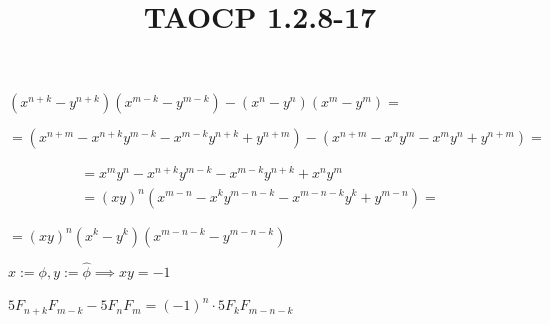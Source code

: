 \documentclass{article}
\title{TAOCP 1.2.8\mbox{-}17}
\begin{document}
\maketitle

\( (x^{n+k} - y^{n+k})(x^{m-k} - y^{m-k}) -(x^{n} - y^{n})(x^{m} - y^{m}) = \)

\[ = (x^{n+m}-x^{n+k}y^{m-k}-x^{m-k}y^{n+k}+y^{n+m}) - (x^{n+m}-x^{n}y^{m}-x^{m}y^{n}+y^{n+m}) = \]

\begin{multline*}
= x^{m}y^{n} - x^{n+k}y^{m-k} - x^{m-k}y^{n+k} + x^{n}y^{m} \\
= {(xy)}^{n} (x^{m-n} - x^{k}y^{m-n-k} -x^{m-n-k}y^{k} + y^{m-n}) =
\end{multline*}

\( = {(xy)}^{n}(x^{k}-y^{k})(x^{m-n-k} - y^{m-n-k}) \)

\( x := \phi, y := \hat\phi \implies xy = -1 \)

\( 5F_{n+k}F_{m-k} - 5F_{n}F_{m} = {(-1)}^{n} \cdot 5F_{k}F_{m-n-k} \)
\end{document}
